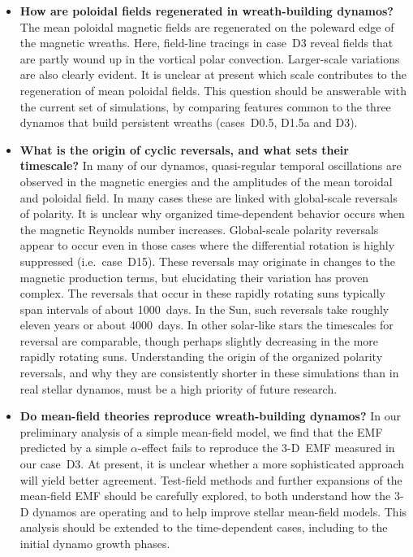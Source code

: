 \begin{itemize}
   \item \textbf{How are poloidal fields regenerated in wreath-building dynamos?}  
     The mean poloidal magnetic fields are regenerated on the poleward
     edge of the magnetic wreaths.  Here, field-line tracings in
     case~D3 reveal fields that are partly wound up in the vortical
     polar convection.  Larger-scale variations are also clearly
     evident.  It is unclear at present which scale contributes to the
     regeneration of mean poloidal fields.  This question should be
     answerable with the current set of simulations, by comparing
     features common to the three dynamos that build persistent
     wreaths (cases~D0.5, D1.5a and D3).

   \item \textbf{What is the origin of cyclic reversals, and what sets their timescale?}
     In many of our dynamos, quasi-regular temporal oscillations are
     observed in the magnetic energies and the amplitudes of the mean
     toroidal and poloidal field.  In many cases these are linked with
     global-scale reversals of polarity.  It is unclear why organized
     time-dependent behavior occurs when the magnetic Reynolds number
     increases.  Global-scale polarity reversals appear to occur even
     in those cases where the differential rotation is highly
     suppressed (i.e.~case~D15).  These reversals may originate in changes to the
     magnetic production terms, but elucidating their variation has
     proven complex.  The reversals that occur in these rapidly
     rotating suns typically span intervals of about 1000~days.  In
     the Sun, such reversals take roughly eleven years or about
     4000~days.  In other solar-like stars the timescales for reversal
     are comparable, though perhaps slightly decreasing in the more
     rapidly rotating suns.  Understanding the origin of the organized 
     polarity reversals, and why they are consistently shorter in
     these simulations than in real stellar dynamos, must be a high priority of future research.

   \item \textbf{Do mean-field theories reproduce wreath-building
     dynamos?}  In our preliminary analysis of a simple mean-field
     model, we find that the EMF predicted by a simple $\alpha$-effect
     fails to reproduce the 3-D~EMF measured in our case~D3.  At
     present, it is unclear whether a more sophisticated approach will
     yield better agreement.  Test-field methods and further
     expansions of the mean-field EMF should be carefully explored, to
     both understand how the 3-D dynamos are operating and to help
     improve stellar mean-field models.  This analysis should be
     extended to the time-dependent cases, including to the initial dynamo
     growth phases.  


\end{itemize}
